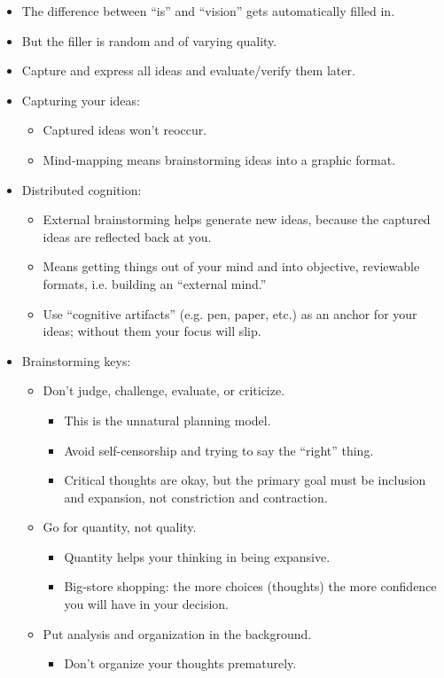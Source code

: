 \documentclass{article}
\begin{document}
\begin{itemize}
  \item The difference between ``is'' and ``vision'' gets automatically filled in.
  \item But the filler is random and of varying quality.
  \item Capture and express all ideas and evaluate/verify them later.
  \item Capturing your ideas:
  \begin{itemize}
    \item Captured ideas won't reoccur.
    \item Mind-mapping means brainstorming ideas into a graphic format.
  \end{itemize}
  \item Distributed cognition:
  \begin{itemize}
    \item External brainstorming helps generate new ideas, because the captured ideas are reflected back at you.
    \item Means getting things out of your mind and into objective, reviewable formats, i.e. building an ``external mind.''
    \item Use ``cognitive artifacts'' (e.g. pen, paper, etc.) as an anchor for your ideas; without them your focus will slip.
  \end{itemize}
  \item Brainstorming keys:
  \begin{itemize}
    \item Don't judge, challenge, evaluate, or criticize.
    \begin{itemize}
      \item This is the unnatural planning model.
      \item Avoid self-censorship and trying to say the ``right'' thing.
      \item Critical thoughts are okay, but the primary goal must be inclusion and expansion, not constriction and contraction.
    \end{itemize}
    \item Go for quantity, not quality.
    \begin{itemize}
      \item Quantity helps your thinking in being expansive.
      \item Big-store shopping: the more choices (thoughts) the more confidence you will have in your decision.
    \end{itemize}
    \item Put analysis and organization in the background.
    \begin{itemize}
      \item Don't organize your thoughts prematurely.
    \end{itemize}
  \end{itemize}
\end{itemize}
\end{document}
